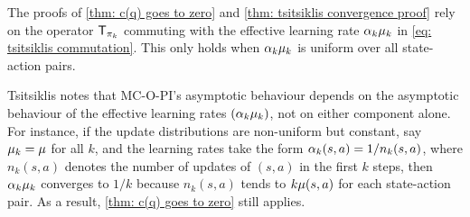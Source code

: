 % 



% 

\vspace{-0.3cm}

The proofs of \autoref{thm: c(q) goes to zero} and \autoref{thm: tsitsiklis convergence proof} rely on the operator $\operatorname{\mathsf{T}}_{\pi_k}$ commuting with the effective learning rate $\alpha_k \mu_k$ in \eqref{eq: tsitsiklis commutation}.
This only holds when $\alpha_k \mu_k$ is uniform over all state-action pairs.

\begin{remark}
\label{rmk: eff lr in the limit}
    Tsitsiklis notes that MC-O-PI's asymptotic behaviour depends on the asymptotic behaviour of the effective learning rates $(\alpha_k \mu_k)$, not on either component alone.
    For instance, if the update distributions are non-uniform but constant, say $\mu_k = \mu$ for all $k$, and the learning rates take the form $\alpha_k(s,a) = 1/n_k(s,a)$, where $n_k(s,a)$ denotes the number of updates of $(s,a)$ in the first $k$ steps,
    then $\alpha_k \mu_k$ converges to $1/k$ because $n_k(s,a)$ tends to $k \mu(s,a)$ for each state-action pair. As a result, \autoref{thm: c(q) goes to zero} still applies.
\end{remark}


